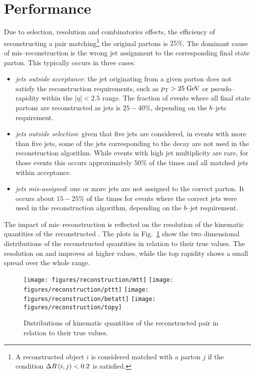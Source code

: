 \section{Performance}

Due to selection, resolution and combinatorics effects, the efficiency
of reconstructing a \ttbar{} pair matching\footnote{A reconstructed
  object $i$ is considered matched with a parton $j$ if the condition
  $\Delta{}R\left(i, j\right)<0.2$ is satisfied.} the original partons is
$25\%$. The dominant cause of mis--reconstruction is the wrong jet
assignment to the corresponding \ttbar{} final state parton. This
typically occurs in three cases:
\begin{itemize}
\item {\it jets outside acceptance}: the jet originating from a given
  parton does not satisfy the reconstruction requirements, such as
  $p_{\mathrm{T}}{}>25 \; \mathrm{GeV}$ or pseudo--rapidity within the $|\eta|<2.5$ range.
  The fraction of events where all \ttbar{} final state partons are
  reconstructed as jets is $25-40\%$, depending on the $b$--jets
  requirement.
\item {\it jets outside selection}: given that five jets are
  considered, in events with more
  than five jets, some of the jets corresponding to
  the \ttbar{} decay are not used in the reconstruction algorithm.
  While events with high jet multiplicity are rare, for those events
  this occurs approximately $50\%$ of the times and all matched jets
  within acceptance.
\item {\it jets mis-assigned}: one or more jets are not assigned to
  the correct parton. It occurs about $15-25\%$ of the times for
  events where the correct jets were used in the reconstruction
  algorithm, depending on the $b$--jet requirement.
\end{itemize}

The impact of mis--reconstruction is reflected on the resolution of
the kinematic quantities of the reconstructed \ttbar. The plots
in Fig.~\ref{fig:reso} show the two dimensional distributions of the
reconstructed quantities in relation to their true values. The
resolution on \mtt{} and \pttt{} improves at higher values, while the
top rapidity shows a small spread over the whole range.

\begin{figure}[!htb]\centering
  \texttt{[image: figures/reconstruction/mtt]}
  \texttt{[image: figures/reconstruction/pttt]}
  \texttt{[image: figures/reconstruction/betatt]}
  \texttt{[image: figures/reconstruction/topy]}
  \caption{
    \label{fig:reso}
    Distributions of kinematic quantities of the
    reconstructed \ttbar{} pair in relation to their true values.
  }
\end{figure} 

